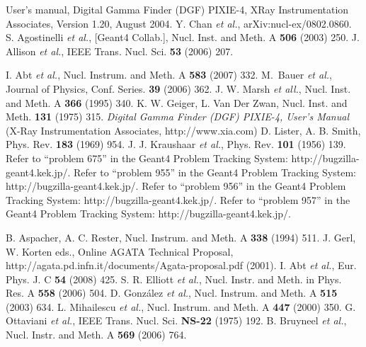 \begin{thebibliography}{99}
 User's manual, Digital Gamma Finder (DGF) PIXIE-4,   XRay Instrumentation Associates, Version 1.20, August 2004.
Y. Chan \textit{et al.}, arXiv:nucl-ex/0802.0860.
 S. Agostinelli \textit{et al.}, [Geant4 Collab.],  
Nucl.  Inst. and Meth. A \textbf{506} (2003) 250.
 J. Allison \textit{et al.}, IEEE Trans. Nucl. Sci.  
\textbf{53} (2006) 207.

 I. Abt \textit{et al.}, Nucl. Instrum. and Meth. A   \textbf{583} (2007) 332.
 M.~Bauer \textit{et al.}, Journal of Physics, Conf.   Series. \textbf{39} (2006) 362.
 J. W. Marsh {\it et all.}, Nucl. Inst. and Meth. A   \textbf{366} (1995) 340.
 K. W. Geiger, L. Van Der Zwan, Nucl. Inst. and Meth.   \textbf{131} (1975) 315.
 \textit{Digital Gamma Finder (DGF) PIXIE-4, User's
    Manual} (X-Ray Instrumentation Associates, http://www.xia.com)
 D. Lister, A. B. Smith, Phys. Rev. \textbf{183} (1969)   954.
 J. J. Kraushaar \textit{et al.}, Phys. Rev.   \textbf{101} (1956) 139.
 Refer to ``problem 675'' in the Geant4 Problem
  Tracking System: http://bugzilla-geant4.kek.jp/.
 Refer to ``problem 955'' in the Geant4 Problem
  Tracking System: http://bugzilla-geant4.kek.jp/.
 Refer to ``problem 956'' in the Geant4 Problem
  Tracking System: http://bugzilla-geant4.kek.jp/.
 Refer to ``problem 957'' in the Geant4 Problem
  Tracking System: http://bugzilla-geant4.kek.jp/.

 B. Aspacher, A. C. Rester, Nucl. Instrum. and Meth. A \textbf{338} (1994) 511.
J. Gerl, W. Korten eds., Online AGATA Technical   Proposal, http://agata.pd.infn.it/documents/Agata-proposal.pdf   (2001).
 I. Abt \textit{et al.}, Eur. Phys. J. C \textbf{54}   (2008) 425.
 S. R. Elliott \textit{et al.}, Nucl. Instr. and   Meth. in Phys. Res. A \textbf{558} (2006) 504.
 D. Gonz\'alez \textit{et al.}, Nucl. Instrum. and Meth.  A \textbf{515} (2003) 634.
 L. Mihailescu \textit{et al.}, Nucl. Instrum. and Meth.    A \textbf{447} (2000) 350.
G. Ottaviani \textit{et al.}, IEEE Trans. Nucl. Sci.   \textbf{NS-22} (1975) 192.
 B. Bruyneel \textit{et al.}, Nucl. Instr. and Meth.    A \textbf{569} (2006) 764.

\end{thebibliography}


